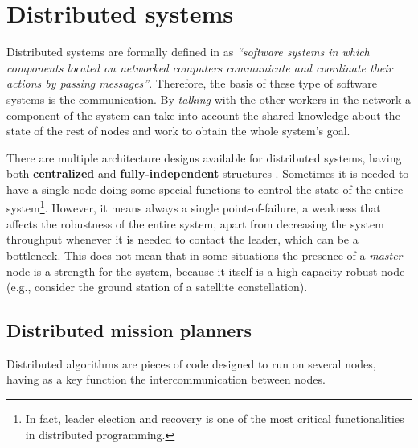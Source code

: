 
\section{Distributed systems}

%
Distributed systems are formally defined in \cite{Coulouris:2011:DSC:2029110} as \textit{``software systems in which components located on networked computers communicate and coordinate their actions by passing messages''}. Therefore, the basis of these type of software systems is the communication. By \emph{talking} with the other workers in the network a component of the system can take into account the shared knowledge about the state of the rest of nodes and work to obtain the whole system's goal.

There are multiple architecture designs available for distributed systems, having both \textbf{centralized} and \textbf{fully-independent} structures \cite[p.~36]{Tanenbaum:2006:DSP:1202502}. Sometimes it is needed to have a single node doing some special functions to control the state of the entire system\footnote{In fact, leader election and recovery is one of the most critical functionalities in distributed programming.}. However, it means always a single point-of-failure, a weakness that affects the robustness of the entire system, apart from decreasing the system throughput whenever it is needed to contact the leader, which can be a bottleneck. This does not mean that in some situations the presence of a \emph{master} node is a strength for the system, because it itself is a high-capacity robust node (e.g., consider the ground station of a satellite constellation).

\subsection{Distributed mission planners}
 
Distributed algorithms are pieces of code designed to run on several nodes, having as a key function the intercommunication between nodes.

